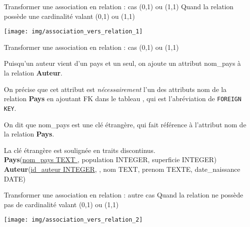 \documentclass[10pt]{beamer}
\begin{document}
\begin{frame}{Transformer une association en relation : cas (0,1) ou (1,1)}
	\alert{Quand la relation possède une cardinalité valant (0,1) ou (1,1)}
	\begin{center}
		\texttt{[image: img/association\_vers\_relation\_1]}
	\end{center}
\end{frame}



\begin{frame}{Transformer une association en relation : cas (0,1) ou (1,1)}

	Puisqu'un auteur vient d'un pays et un seul, on ajoute un attribut nom\_pays à la relation \textbf{Auteur}.

	On précise que cet attribut est \textit{nécessairement} l'un des attributs nom de la relation \textbf{Pays} en ajoutant \og FK\fg{}  dans le tableau , qui est l'abréviation de \texttt{FOREIGN KEY}.

	On dit que nom\_pays est une \alert{clé étrangère}, qui \alert{fait référence} à l'attribut nom de la relation \textbf{Pays}.

	La clé étrangère est soulignée en traits discontinus.\\


	{\footnotesize
		\textbf{Pays}(\uline{nom\_pays TEXT }, population INTEGER, superficie INTEGER)}\\
	{\scriptsize\textbf{Auteur}(\uline{id\_auteur INTEGER},  , nom TEXT, prenom TEXTE, date\_naissance DATE)}
\end{frame}

\begin{frame}{Transformer une association en relation : autre cas}
	\alert{Quand la relation ne possède pas de cardinalité valant (0,1) ou (1,1)}
	\begin{center}
		\texttt{[image: img/association\_vers\_relation\_2]}
	\end{center}
\end{frame}
\end{document}
